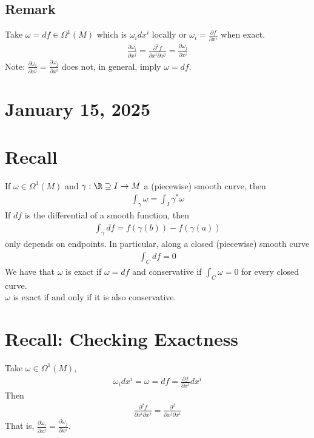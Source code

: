 \documentclass[11pt]{article}
\begin{document}
\subsection*{Remark}
\label{sec:org7ad20a9}
Take \(\omega=df\in\Omega^{1}(M)\) which is \(\omega_{i}dx^{i}\) locally or \(\omega_{i}=\frac{\partial f}{\partial x^{i}}\) when exact.\\
\begin{align*}
  \frac{\partial\omega_{i}}{\partial x^{j}}
  =\frac{\partial^{2}f}{\partial x^{i}\partial x^{j}}
  =\frac{\partial\omega_{j}}{\partial x^{i}}
\end{align*}
Note: \(\frac{\partial\omega_{i}}{\partial x^{j}}=\frac{\partial\omega_{j}}{\partial x^{i}}\) does not, in general, imply \(\omega=df\).\\
\section*{January 15, 2025}
\label{sec:org05e0541}
\section*{Recall}
\label{sec:org9ba66e4}
If \(\omega\in\Omega^{1}(M)\) and \(\gamma:\R\supseteq I\to M\) a (piecewise) smooth curve, then\\
\begin{align*}
  \int_{\gamma}\omega
  =\int_{I}\gamma^{*}\omega
\end{align*}
If \(df\) is the differential of a smooth function, then\\
\begin{align*}
  \int_{\gamma}df
  =f(\gamma(b))-f(\gamma(a))
\end{align*}
only depends on endpoints. In particular, along a closed (piecewise) smooth curve\\
\begin{align*}
  \int_{C}df=0
\end{align*}
We have that \(\omega\) is exact if \(\omega=df\) and conservative if \(\int_{C}\omega=0\) for every closed curve.\\
\(\omega\) is exact if and only if it is also conservative.\\
\section*{Recall: Checking Exactness}
\label{sec:org2baf7c2}
Take \(\omega\in\Omega^{1}(M)\),\\
\begin{align*}
  \omega_{i}dx^{i}=\omega=df=\frac{\partial f}{\partial x^{i}}dx^{i}
\end{align*}
Then\\
\begin{align*}
  \frac{\partial^{2}f}{\partial x^{i}\partial x^{j}}
  =\frac{\partial^{2}}{\partial x^{j}\partial x^{i}}
\end{align*}
That is, \(\frac{\partial\omega_{i}}{\partial x^{j}}=\frac{\partial \omega_{j}}{\partial x^{i}}\).\\
\end{document}
